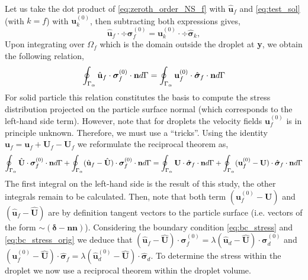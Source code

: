 Let us take the dot product of \ref{eq:zeroth_order_NS_f} with $\hat{\textbf{u}}_f$ and \ref{eq:test_sol} (with $k = f$) with $\textbf{u}_k^{(0)}$, then subtracting both expressions gives, 
\begin{equation*}
    \hat{\textbf{u}}_f\cdot \div\bm\sigma_f^{(0)}
    =
    \textbf{u}_k^{(0)} \cdot \div \hat{\bm\sigma}_k, 
\end{equation*}
Upon integrating over $\Omega_f$ which is the domain outside the droplet at \textbf{y},  we obtain the following relation, 
\begin{equation*}
    \oint_{\Gamma_{\alpha}} \hat{\textbf{u}}_f\cdot  \bm\sigma_f^{(0)} \cdot \textbf{n} d\Gamma
    = 
    \oint_{\Gamma_{\alpha}} \textbf{u}_f^{(0)}\cdot  \hat{\bm\sigma}_f \cdot \textbf{n} d\Gamma
\end{equation*}
For solid particle this relation constitutes the basis to compute the stress distribution projected on the particle surface normal (which corresponds to the left-hand side term). 
However, note that for droplets the velocity fields $\textbf{u}_f^{(0)}$ is in principle unknown.
Therefore, we must use a ``tricks''. 
Using the identity $\textbf{u}_f = \textbf{u}_f +\textbf{U}_f-\textbf{U}_f$ we reformulate the reciprocal theorem as, 
\begin{equation}
    \intS{\hat{\textbf{U}}\cdot  \bm\sigma_f^{(0)} \cdot \textbf{n}}
    + \intS{(\hat{\textbf{u}}_f - \hat{\textbf{U}})\cdot  \bm\sigma_f^{(0)} \cdot \textbf{n}}
    = 
    \intS{\textbf{U}\cdot  \hat{\bm\sigma}_f \cdot \textbf{n}}
    + \intS{(\textbf{u}_f^{(0)} - \textbf{U})\cdot  \hat{\bm\sigma}_f \cdot \textbf{n}}
    \label{eq:reciprocal_f}
\end{equation}
The first integral on the left-hand side is the result of this study, the other integrals remain to be calculated. 
Then, note that both term $(\textbf{u}_f^{(0)} - \textbf{U})$ and $(\hat{\textbf{u}}_f - \hat{\textbf{U}})$ are by definition tangent vectors to the particle surface (i.e. vectors of the form $\sim (\bm\delta - \textbf{nn})$). 
Considering the boundary condition \ref{eq:bc_stress} and \ref{eq:bc_stress_orig} we deduce that $(\hat{\textbf{u}}_f - \hat{\textbf{U}})\cdot  \bm\sigma_f^{(0)} = \lambda (\hat{\textbf{u}}_d - \hat{\textbf{U}})\cdot  \bm\sigma_d^{(0)}$ and  $({\textbf{u}}_f^{(0)} - \hat{\textbf{U}})\cdot  \hat{\bm\sigma}_f = \lambda (\hat{\textbf{u}}_d^{(0)} - \hat{\textbf{U}})\cdot  \hat{\bm\sigma}_d$. 
To determine the stress within the droplet we now use a reciprocal theorem within the droplet volume. 

